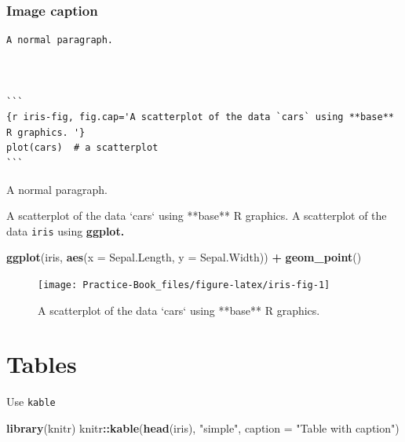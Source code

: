 \documentclass[
]{book}
\newenvironment{Shaded}{\begin{snugshade}}{\end{snugshade}}
\newcommand{\DataTypeTok}[1]{\textcolor[rgb]{0.13,0.29,0.53}{#1}}
\newcommand{\KeywordTok}[1]{\textcolor[rgb]{0.13,0.29,0.53}{\textbf{#1}}}
\newcommand{\NormalTok}[1]{#1}
\newcommand{\OperatorTok}[1]{\textcolor[rgb]{0.81,0.36,0.00}{\textbf{#1}}}
\newcommand{\StringTok}[1]{\textcolor[rgb]{0.31,0.60,0.02}{#1}}
\begin{document}
\hypertarget{image-caption}{%
\subsubsection{Image caption}\label{image-caption}}

\begin{verbatim}
A normal paragraph.



```
{r iris-fig, fig.cap='A scatterplot of the data `cars` using **base** R graphics. '}
plot(cars)  # a scatterplot
```
\end{verbatim}

A normal paragraph.

A scatterplot of the data `cars` using **base** R graphics.  A scatterplot of the data \texttt{iris} using \textbf{ggplot.}

\begin{Shaded}
\begin{Highlighting}[]
\KeywordTok{ggplot}\NormalTok{(iris, }\KeywordTok{aes}\NormalTok{(}\DataTypeTok{x =}\NormalTok{ Sepal.Length, }\DataTypeTok{y =}\NormalTok{ Sepal.Width)) }\OperatorTok{+}\StringTok{ }\KeywordTok{geom\_point}\NormalTok{()}
\end{Highlighting}
\end{Shaded}

\begin{figure}

{\centering \texttt{[image: Practice-Book\_files/figure-latex/iris-fig-1]} 

}

\caption{A scatterplot of the data `cars` using **base** R graphics. }\label{fig:iris-fig}
\end{figure}

\hypertarget{tables}{%
\section{Tables}\label{tables}}

Use \texttt{kable}

\begin{Shaded}
\begin{Highlighting}[]
\KeywordTok{library}\NormalTok{(knitr)}
\NormalTok{knitr}\OperatorTok{::}\KeywordTok{kable}\NormalTok{(}\KeywordTok{head}\NormalTok{(iris), }\StringTok{"simple"}\NormalTok{,  }\DataTypeTok{caption =} \StringTok{"Table with caption"}\NormalTok{)}
\end{Highlighting}
\end{Shaded}
\end{document}
